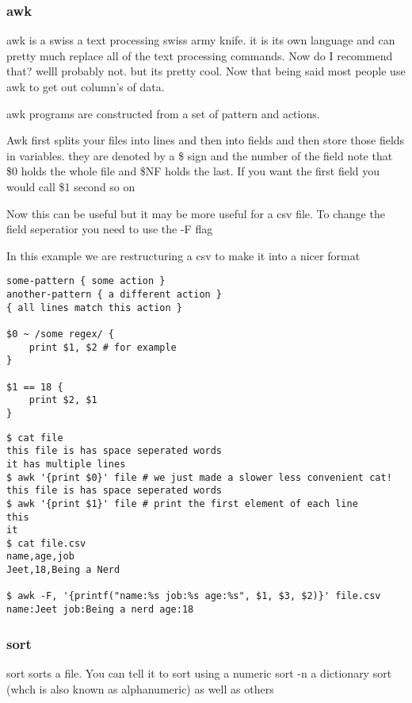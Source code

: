 \documentclass[a4paper]{article}
\begin{document}
\subsubsection*{awk}
\label{sec:orgf55722d}
\begin{notes}
	awk is a swiss a text processing swiss army knife. it is its own language and
	can pretty much replace all of the text processing commands. Now do I recommend
	that? welll probably not. but its pretty cool. Now that being said most people
	use awk to get out column's of data.

	awk programs are constructed from a set of pattern and actions.

	Awk first splits your files into lines and then into fields and then store those
	fields in variables. they are denoted by a \$ sign and the number of the field
	note that \$0 holds the whole file and \$NF holds the last. If you want the first
	field you would call \$1 second so on

	Now this can be useful but it may be more useful for a csv file. To change the
	field seperatior you need to use the -F flag

	In this example we are restructuring a csv to make it into a nicer format
\end{notes}

\begin{verbatim}
some-pattern { some action }
another-pattern { a different action }
{ all lines match this action }

$0 ~ /some regex/ {
    print $1, $2 # for example
}

$1 == 18 {
    print $2, $1
}
\end{verbatim}

\begin{verbatim}
$ cat file
this file is has space seperated words
it has multiple lines
$ awk '{print $0}' file # we just made a slower less convenient cat!
this file is has space seperated words
$ awk '{print $1}' file # print the first element of each line
this
it
$ cat file.csv
name,age,job
Jeet,18,Being a Nerd

$ awk -F, '{printf("name:%s job:%s age:%s", $1, $3, $2)}' file.csv
name:Jeet job:Being a nerd age:18
\end{verbatim}

\subsubsection*{sort}
\label{sec:org8df4a92}
\begin{notes}
	sort sorts a file. You can tell it to sort using a numeric sort -n a dictionary
	sort (whch is also known as alphanumeric) as well as others
\end{notes}
\end{document}

